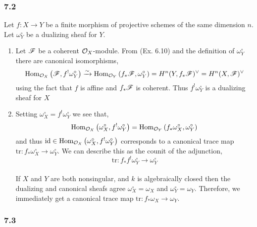 \documentclass[12pt]{article}
\begin{document}
\subsubsection{7.2}

\renewcommand{\tr}{\mathrm{tr}}

Let $f : X \to Y$ be a finite morphism of projective schemes of the same dimension $n$. Let $\omega_Y^\circ$ be a dualizing sheaf for $Y$.

\begin{enumerate}
\item Let $\mathscr{F}$ be a coherent $\mathcal{O}_{X}$-module. From (Ex. 6.10) and the definition of $\omega_Y^\circ$ there are canonical isomorphisms,
\[ \mathrm{Hom}_{\mathcal{O}_{X}} \left( \mathscr{F}, f^! \omega_Y^\circ \right) \xrightarrow{\sim} \mathrm{Hom}_{\mathcal{O}_{Y}} \left( f_* \mathscr{F}, \omega_Y^\circ \right) = H^n(Y, f_* \mathscr{F})^\vee = H^n(X, \mathscr{F})^\vee \]
using the fact that $f$ is affine and $f_* \mathscr{F}$ is coherent. Thus $f^! \omega_Y^\circ$ is a dualizing sheaf for $X$

\item Setting $\omega_X^\circ  = f^! \omega_Y^\circ$ we see that,
\[ \mathrm{Hom}_{\mathcal{O}_{X}} \left( \omega_X^\circ, f^! \omega_Y^\circ \right) = \mathrm{Hom}_{\mathcal{O}_{Y}} \left( f_* \omega_X^\circ, \omega_Y^\circ \right) \]
and thus $\mathrm{id} \in \mathrm{Hom}_{\mathcal{O}_{X}} \left( \omega_X^\circ, f^! \omega_Y^\circ \right)$ corresponds to a canonical trace map $\tr : f_* \omega_X^\circ \to \omega_Y^\circ$. We can describe this as the counit of the adjunction,
\[ \tr : f_* f^! \omega_Y^\circ \to \omega_Y^\circ \]
\bigskip\\
If $X$ and $Y$ are both nonsingular, and $k$ is algebraically closed then the dualizing and canonical sheafs agree $\omega_X^\circ = \omega_X$ and $\omega_Y^\circ = \omega_Y$. Therefore, we immediately get a canonical trace map $\tr : f_* \omega_X \to \omega_Y$.
\end{enumerate}

\renewcommand{\tr}[1]{\mathrm{tr}\left( #1 \right)}

\subsubsection{7.3}
\end{document}
